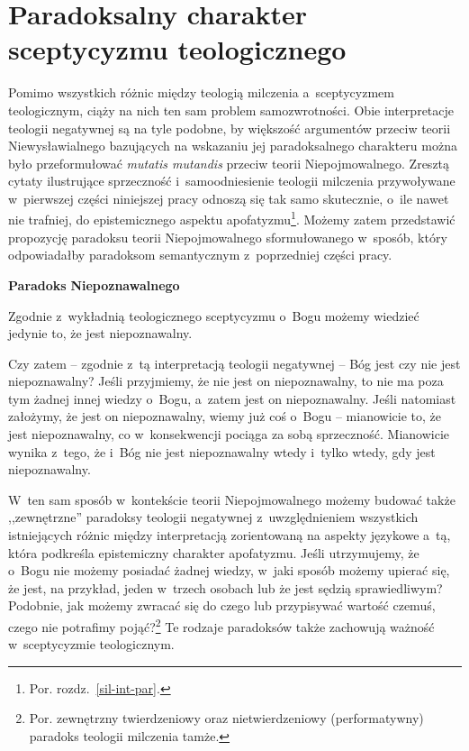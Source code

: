 \section{Paradoksalny charakter sceptycyzmu teologicznego}

Pomimo wszystkich różnic między teologią milczenia a~sceptycyzmem teologicznym, ciąży na nich ten sam problem samozwrotności. Obie interpretacje teologii negatywnej są na tyle podobne, by większość argumentów przeciw teorii Niewysławialnego bazujących na wskazaniu jej paradoksalnego charakteru można było przeformułować \textit{mutatis mutandis} przeciw teorii Niepojmowalnego. Zresztą cytaty ilustrujące sprzeczność i~samoodniesienie teologii milczenia przywoływane w~pierwszej części niniejszej pracy odnoszą się tak samo skutecznie, o~ile nawet nie trafniej, do epistemicznego aspektu apofatyzmu\footnote{Por. rozdz.~\ref{sil-int-par}.}. Możemy zatem przedstawić propozycję paradoksu teorii Niepojmowalnego sformułowanego w~sposób, który odpowiadałby paradoksom semantycznym z~poprzedniej części pracy.

\textbf{Paradoks} \textbf{Niepoznawalnego}

Zgodnie z~wykładnią teologicznego sceptycyzmu o~Bogu możemy wiedzieć jedynie to, że jest niepoznawalny.

Czy zatem -- zgodnie z~tą interpretacją teologii negatywnej -- Bóg jest czy nie jest niepoznawalny? Jeśli przyjmiemy, że nie jest on niepoznawalny, to nie ma poza tym żadnej innej wiedzy o~Bogu, a~zatem jest on niepoznawalny. Jeśli natomiast założymy, że jest on niepoznawalny, wiemy już coś o~Bogu -- mianowicie to, że jest niepoznawalny, co w~konsekwencji pociąga za sobą sprzeczność. Mianowicie wynika z~tego, że i~Bóg nie jest niepoznawalny wtedy i~tylko wtedy, gdy jest niepoznawalny.

W~ten sam sposób w~kontekście teorii Niepojmowalnego możemy budować także ,,zewnętrzne'' paradoksy teologii negatywnej z~uwzględnieniem wszystkich istniejących różnic między interpretacją zorientowaną na aspekty językowe a~tą, która podkreśla epistemiczny charakter apofatyzmu. Jeśli utrzymujemy, że o~Bogu nie możemy posiadać żadnej wiedzy, w~jaki sposób możemy upierać się, że jest, na przykład, jeden w~trzech osobach lub że jest sędzią sprawiedliwym? Podobnie, jak możemy zwracać się do czego lub przypisywać wartość czemuś, czego nie potrafimy pojąć?\footnote{Por. zewnętrzny twierdzeniowy oraz nietwierdzeniowy (performatywny) paradoks teologii milczenia tamże.} Te rodzaje paradoksów także zachowują ważność w~sceptycyzmie teologicznym.

